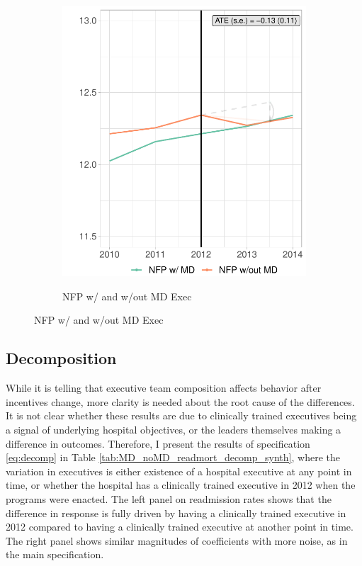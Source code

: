 \documentclass[12pt]{article}
\begin{document}
\begin{figure}
\begin{subfigure}[b]{0.45\textwidth}
         \label{fig:mort_synth_plotc}
     \end{subfigure}
     \hfill
     \begin{subfigure}[b]{0.45\textwidth}
         \centering
         \caption{NFP w/ and w/out MD Exec}
         \includegraphics[width=\textwidth]{Objects/mort_md_nomd_synth_graph.pdf}
         \label{fig:mort_synth_plotd}
     \end{subfigure}
        \label{fig:mort_synth_plot}
    \end{figure}

    \subsection{Decomposition}

    While it is telling that executive team composition affects behavior after incentives change, more clarity is needed about the root cause of the differences. It is not clear whether these results are due to clinically trained executives being a signal of underlying hospital objectives, or the leaders themselves making a difference in outcomes. Therefore, I present the results of specification \ref{eq:decomp} in Table \ref{tab:MD_noMD_readmort_decomp_synth}, where the variation in executives is either existence of a hospital executive at any point in time, or whether the hospital has a clinically trained executive in 2012 when the programs were enacted. The left panel on readmission rates shows that the difference in response is fully driven by having a clinically trained executive in 2012 compared to having a clinically trained executive at another point in time. The right panel shows similar magnitudes of coefficients with more noise, as in the main specification.  
\end{document}

